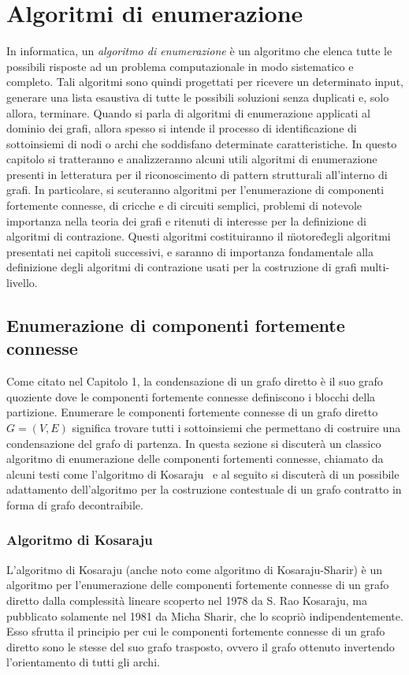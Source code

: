 \chapter{Algoritmi di enumerazione}

In informatica, un \textit{algoritmo di enumerazione} \`e un algoritmo che elenca tutte le possibili risposte ad un
problema computazionale in modo sistematico e completo. Tali algoritmi sono quindi progettati per ricevere un
determinato input, generare una lista esaustiva di tutte le possibili soluzioni senza duplicati e, solo allora,
terminare.
Quando si parla di algoritmi di enumerazione applicati al dominio dei grafi, allora spesso si intende il processo di
identificazione di sottoinsiemi di nodi o archi che soddisfano determinate caratteristiche.
In questo capitolo si tratteranno e analizzeranno alcuni utili algoritmi di enumerazione presenti in letteratura per
il riconoscimento di pattern strutturali all'interno di grafi. In particolare, si scuteranno algoritmi per l'enumerazione
di componenti fortemente connesse, di cricche e di circuiti semplici, problemi di notevole importanza nella teoria dei
grafi e ritenuti di interesse per la definizione di algoritmi di contrazione.
Questi algoritmi costituiranno il \"motore\" degli algoritmi presentati nei capitoli successivi, e saranno di
importanza fondamentale alla definizione degli algoritmi di contrazione usati per la costruzione di grafi multi-livello.

\section{Enumerazione di componenti fortemente connesse}\label{subsec:enumerazione-di-componenti-fortemente-connesse}
Come citato nel Capitolo 1, la condensazione di un grafo diretto \`e il suo grafo quoziente dove le componenti
fortemente connesse definiscono i blocchi della partizione.
Enumerare le componenti fortemente connesse di un grafo diretto $G = (V, E)$ significa trovare tutti i sottoinsiemi
che permettano di costruire una condensazione del grafo di partenza.
In questa sezione si discuter\`a un classico algoritmo di enumerazione delle componenti fortementi connesse, chiamato
da alcuni testi come l'algoritmo di Kosaraju~\cite{SHARIR198167} e al seguito si discuter\`a di un possibile adattamento
dell'algoritmo per la costruzione contestuale di un grafo contratto in forma di grafo decontraibile.

\subsection{Algoritmo di Kosaraju}\label{subsec:algoritmo-di-kosaraju}
L'algoritmo di Kosaraju (anche noto come algoritmo di Kosaraju-Sharir) \`e un algoritmo per l'enumerazione
delle componenti fortemente connesse di un grafo diretto dalla complessit\`a lineare scoperto nel 1978 da S. Rao
Kosaraju, ma pubblicato solamente nel 1981 da Micha Sharir, che lo scopri\`o indipendentemente.
Esso sfrutta il principio per cui le componenti fortemente connesse di un grafo diretto sono le stesse del suo grafo
trasposto, ovvero il grafo ottenuto invertendo l'orientamento di tutti gli archi. \newline


